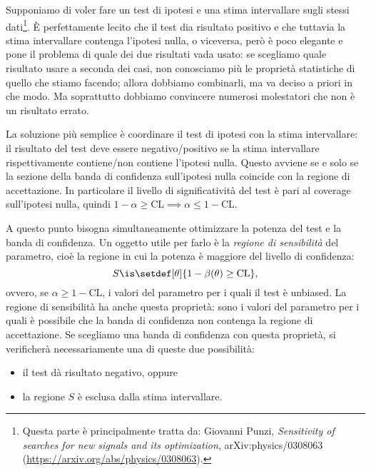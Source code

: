 Supponiamo di voler fare un test di ipotesi e una stima intervallare sugli stessi dati\footnote{Questa parte è principalmente tratta da: Giovanni Punzi, \emph{Sensitivity of searches for new signals and its optimization}, 	arXiv:physics/0308063 (\url{https://arxiv.org/abs/physics/0308063}).}.
È perfettamente lecito che il test dia risultato positivo
e che tuttavia la stima intervallare contenga l'ipotesi nulla, o viceversa,
però è poco elegante e pone il problema di quale dei due risultati vada usato:
se scegliamo quale risultato usare a seconda dei casi,
non conosciamo più le proprietà statistiche di quello che stiamo facendo;
allora dobbiamo combinarli, ma va deciso a priori in che modo.
Ma soprattutto dobbiamo convincere numerosi molestatori che non è un risultato errato.

La soluzione più semplice è coordinare il test di ipotesi con la stima intervallare:
il risultato del test deve essere negativo/positivo
se la stima intervallare rispettivamente contiene/non contiene l'ipotesi nulla.
Questo avviene se e solo se
la sezione della banda di confidenza sull'ipotesi nulla
coincide con la regione di accettazione.
In particolare il livello di significatività del test è pari al coverage sull'ipotesi nulla,
quindi $1-\alpha\ge\mathrm{CL} \implies \alpha\le1-\mathrm{CL}$.

A questo punto bisogna simultaneamente ottimizzare la potenza del test e la banda di confidenza.
Un oggetto utile per farlo è la \emph{regione di sensibilità} del parametro,
cioè la regione in cui la potenza è maggiore del livello di confidenza:
\begin{equation*}
	S \is \setdef[\theta]{1-\beta(\theta) \ge \mathrm{CL}},
\end{equation*}
ovvero, se $\alpha\ge1-\mathrm{CL}$, i valori del parametro per i quali il test è unbiased.
La regione di sensibilità ha anche questa proprietà:
sono i valori del parametro per i quali è possibile
che la banda di confidenza non contenga la regione di accettazione.
Se scegliamo una banda di confidenza con questa proprietà,
si verificherà necessariamente una di queste due possibilità:
\begin{itemize}
	\item il test dà risultato negativo, oppure
	\item la regione $S$ è esclusa dalla stima intervallare.
\end{itemize}
